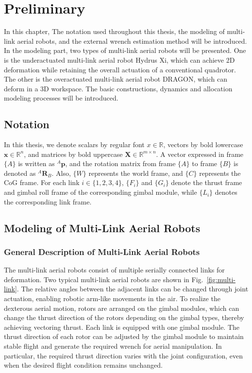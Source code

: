 \chapter{Preliminary}

In this chapter, The notation used throughout this thesis, the modeling of multi-link aerial robots, and the external wrench estimation method will be introduced. In the modeling part, two types of multi-link aerial robots will be presented. One is the underactuated multi-link aerial robot Hydrus Xi, which can achieve 2D deformation while retaining the overall actuation of a conventional quadrotor. The other is the overactuated multi-link aerial robot DRAGON, which can deform in a 3D workspace. The basic constructions, dynamics and allocation modeling processes will be introduced.


\section{Notation}
In this thesis, we denote scalars by regular font $x \in \mathbb{R}$, vectors by bold lowercase $\boldsymbol{x} \in \mathbb{R}^n$, and matrices by bold uppercase $\boldsymbol{X} \in \mathbb{R}^{m \times n}$. A vector expressed in frame $\{A\}$ is written as $^A\boldsymbol{p}$, and the rotation matrix from frame $\{A\}$ to frame $\{B\}$ is denoted as $^A\boldsymbol{R}_B$.
Also, $\{W\}$ represents the world frame, and $\{C\}$ represents the CoG frame. For each link $i\in\{1,2,3,4\}$, $\{F_i\}$ and $\{G_i\}$ denote the thrust frame and gimbal roll frame of the corresponding gimbal module, while $\{L_i\}$ denotes the corresponding link frame.


\section{Modeling of Multi-Link Aerial Robots}

\subsection{General Description of Multi-Link Aerial Robots}
The multi-link aerial robots consist of multiple serially connected links for deformation. Two typical multi-link aerial robots are shown in Fig.~\ref{fig:multi-link}. The relative angles between the adjacent links can be changed through joint actuation, enabling robotic arm-like movements in the air. To realize the dexterous aerial motion, rotors are arranged on the gimbal modules, which can change the thrust direction of the rotors depending on the gimbal types, thereby achieving vectoring thrust. Each link is equipped with one gimbal module. The thrust direction of each rotor can be adjusted by the gimbal module to maintain stable flight and generate the required wrench for aerial manipulation. In particular, the required thrust direction varies with the joint configuration, even when the desired flight condition remains unchanged.


